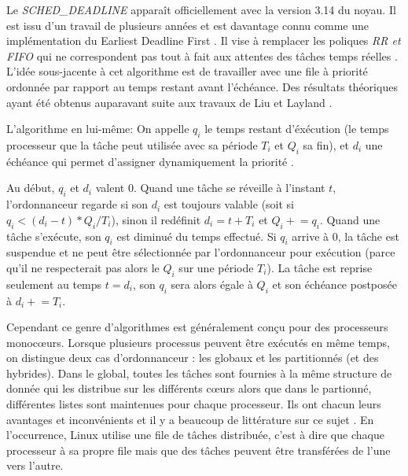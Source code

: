 \documentclass[letterpaper]{article}
\begin{document}
Le \textit{SCHED\_DEADLINE} apparaît officiellement avec la version 3.14 du noyau. Il est issu d'un travail de plusieurs années et est davantage connu comme une implémentation du Earliest Deadline First \citep{faggioli2009edf}. Il vise à remplacer les poliques \textit{RR et FIFO} qui ne correspondent pas tout à fait aux attentes des tâches temps réelles \citep{buttazzo2011hard}. L'idée sous-jacente à cet algorithme est de travailler avec une file à priorité ordonnée par rapport au temps restant avant l'échéance. Des résultats théoriques ayant été obtenus auparavant suite aux travaux de Liu et Layland \citep{liu1973scheduling}.

\newcommand{\pluseq}{\mathrel{+}=}

L'algorithme en lui-même:
On appelle \textit{$q_i$} le temps restant d'éxécution (le temps processeur que la tâche peut utilisée avec sa période \textit{$T_i$} et \textit{$Q_i$} sa fin), et \textit{$d_i$} une échéance qui permet d'assigner dynamiquement la priorité \citep{LelliEDFLinux}.

Au début, \textit{$q_i$} et \textit{$d_i$} valent 0.
Quand une tâche se réveille à l'instant $t$, l'ordonnanceur regarde si son $d_i$ est toujours valable (soit si $q_i < (d_i - t) * Q_i/ T_i$), sinon il redéfinit $d_i = t + T_i$ et $Q_i \pluseq q_i$. Quand une tâche s'exécute, son $q_i$ est diminué du temps effectué. Si $q_i$ arrive à 0, la tâche est suspendue et ne peut être sélectionnée par l'ordonnanceur pour exécution (parce qu'il ne respecterait pas alors le $Q_i$ sur une période $T_i$). La tâche est reprise seulement au temps $t = d_i$, son $q_i$ sera alors égale à $Q_i$ et son échéance postposée à $d_i \pluseq T_i$.

Cependant ce genre d'algorithmes est généralement conçu pour des processeurs monocœurs. Lorsque plusieurs processus peuvent être exécutés en même temps, on distingue deux cas d'ordonnanceur \citep{faggioli2009implementation}: les globaux et les partitionnés (et des hybrides). Dans le global, toutes les tâches sont fournies à la même structure de donnée qui les distribue sur les différents cœurs alors que dans le partionné, différentes listes sont maintenues pour chaque processeur. Ils ont chacun leurs avantages et inconvénients et il y a beaucoup de littérature sur ce sujet \citep{bastoni2010empirical, lelli2012experimental}.
En l'occurrence, Linux utilise une file de tâches distribuée, c'est à dire que chaque processeur à sa propre file mais que des tâches peuvent être transférées de l'une vers l'autre.
\end{document}
